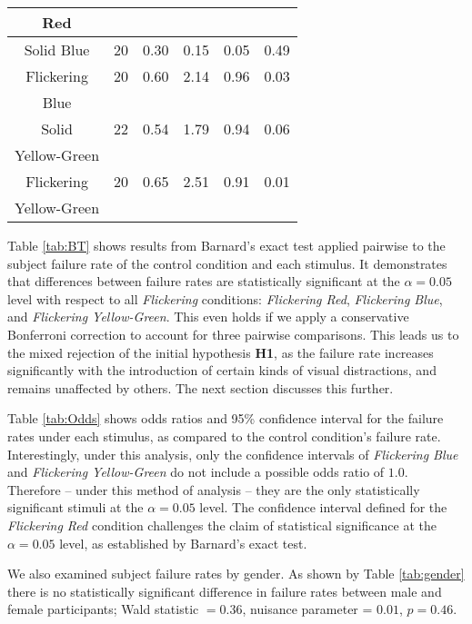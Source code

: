 \documentclass{llncs}
\begin{document}
\begin{table}[!htb]
{{\begin{tabular}{||c|c|c|c|c|c||}
Red & & & & &
\\ \hline
Solid Blue &		20 &	0.30	& 0.15 & 0.05 & 0.49
\\ \hline
Flickering &          	20 & 0.60	 & 2.14 & 0.96 & 0.03
\vspace*{-0.3cm}\\
Blue& & & & &
\\ \hline
Solid &           22 & 0.54	 &  1.79 & 0.94 & 0.06
\vspace*{-0.3cm}\\
Yellow-Green& & & & &
\\ \hline
Flickering &           		20 & 0.65  & 2.51 & 0.91 & 0.01
\vspace*{-0.3cm}\\
Yellow-Green & & & & &
\\ \hline \cline{1-6}
\end{tabular}}
}
\end{table}

Table \ref{tab:BT} shows results from Barnard's exact test applied pairwise 
to the subject failure rate of the control condition and each stimulus. It demonstrates 
that differences between failure rates are statistically significant at the $\alpha = 0.05$ 
level with respect to all {\em Flickering} conditions: {\em Flickering Red}, 
{\em Flickering Blue},  and {\em Flickering Yellow-Green}. 
This even holds if we apply a conservative Bonferroni correction to account for three 
pairwise comparisons.  This leads us to the mixed rejection of the initial hypothesis \textbf{H1},
as the failure rate increases significantly with the introduction of certain kinds 
of visual distractions, and remains unaffected by others. The next section 
discusses this further.

Table \ref{tab:Odds} shows odds ratios and 95\% confidence interval for the failure rates under 
each stimulus, as compared to the control condition's failure rate. Interestingly, under this analysis, 
only the confidence intervals of  {\em Flickering Blue} and {\em Flickering Yellow-Green} do not include a 
possible odds ratio of $1.0$. Therefore -- under this method of analysis -- they are the
only statistically significant stimuli at the $\alpha = 0.05$ level. The confidence interval 
defined for the {\em Flickering Red} condition challenges the claim of statistical significance at 
the $\alpha = 0.05$ level, as established by Barnard's exact test.  

We also examined subject failure rates by gender. As shown by Table \ref{tab:gender}
there is no statistically significant difference in failure rates between male and female participants;
Wald statistic $= 0.36$, nuisance parameter = $0.01$, $p = 0.46$.
\end{document}
